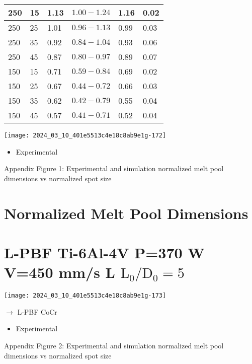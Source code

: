 \documentclass[10pt]{article}
\begin{document}
\begin{center}
\begin{tabular}{|l|l|l|l|l|l|}
\hline
250 & 15 & 1.13 & $1.00-1.24$ & 1.16 & 0.02 \\
\hline
250 & 25 & 1.01 & $0.96-1.13$ & 0.99 & 0.03 \\
\hline
250 & 35 & 0.92 & $0.84-1.04$ & 0.93 & 0.06 \\
\hline
250 & 45 & 0.87 & $0.80-0.97$ & 0.89 & 0.07 \\
\hline
150 & 15 & 0.71 & $0.59-0.84$ & 0.69 & 0.02 \\
\hline
150 & 25 & 0.67 & $0.44-0.72$ & 0.66 & 0.03 \\
\hline
150 & 35 & 0.62 & $0.42-0.79$ & 0.55 & 0.04 \\
\hline
150 & 45 & 0.57 & $0.41-0.71$ & 0.52 & 0.04 \\
\hline
\end{tabular}
\end{center}

\begin{center}
\texttt{[image: 2024\_03\_10\_401e5513c4e18c8ab9e1g-172]}
\end{center}

\begin{itemize}
  \item Experimental
\end{itemize}

Appendix Figure 1: Experimental and simulation normalized melt pool dimensions vs normalized spot size

\section*{Normalized Melt Pool Dimensions}
\section*{L-PBF Ti-6Al-4V P=370 W V=450 mm/s L $\mathrm{L}_{0} / \mathrm{D}_{0}=5$}
\begin{center}
\texttt{[image: 2024\_03\_10\_401e5513c4e18c8ab9e1g-173]}
\end{center}

$\rightarrow$ L-PBF CoCr

\begin{itemize}
  \item Experimental
\end{itemize}

Appendix Figure 2: Experimental and simulation normalized melt pool dimensions vs normalized spot size
\end{document}
